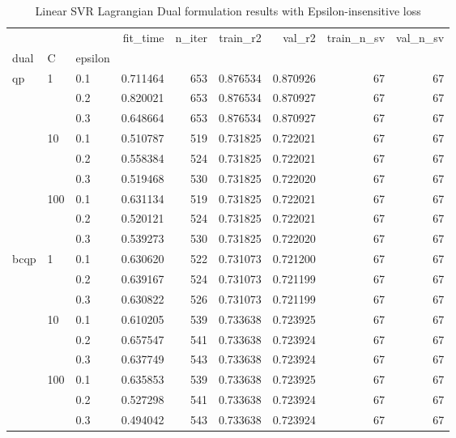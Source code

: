 \begin{table}[H]
\centering
\caption{Linear SVR Lagrangian Dual formulation results with Epsilon-insensitive loss}
\label{linear_lagrangian_dual_svr_cv_results}
\begin{tabular}{lllrrrrrr}
\toprule
     &     &     &  fit\_time &  n\_iter &  train\_r2 &    val\_r2 &  train\_n\_sv &  val\_n\_sv \\
dual & C & epsilon &           &         &           &           &             &           \\
\midrule
qp & 1   & 0.1 &  0.711464 &     653 &  0.876534 &  0.870926 &          67 &        67 \\
     &     & 0.2 &  0.820021 &     653 &  0.876534 &  0.870927 &          67 &        67 \\
     &     & 0.3 &  0.648664 &     653 &  0.876534 &  0.870927 &          67 &        67 \\
     & 10  & 0.1 &  0.510787 &     519 &  0.731825 &  0.722021 &          67 &        67 \\
     &     & 0.2 &  0.558384 &     524 &  0.731825 &  0.722021 &          67 &        67 \\
     &     & 0.3 &  0.519468 &     530 &  0.731825 &  0.722020 &          67 &        67 \\
     & 100 & 0.1 &  0.631134 &     519 &  0.731825 &  0.722021 &          67 &        67 \\
     &     & 0.2 &  0.520121 &     524 &  0.731825 &  0.722021 &          67 &        67 \\
     &     & 0.3 &  0.539273 &     530 &  0.731825 &  0.722020 &          67 &        67 \\
bcqp & 1   & 0.1 &  0.630620 &     522 &  0.731073 &  0.721200 &          67 &        67 \\
     &     & 0.2 &  0.639167 &     524 &  0.731073 &  0.721199 &          67 &        67 \\
     &     & 0.3 &  0.630822 &     526 &  0.731073 &  0.721199 &          67 &        67 \\
     & 10  & 0.1 &  0.610205 &     539 &  0.733638 &  0.723925 &          67 &        67 \\
     &     & 0.2 &  0.657547 &     541 &  0.733638 &  0.723924 &          67 &        67 \\
     &     & 0.3 &  0.637749 &     543 &  0.733638 &  0.723924 &          67 &        67 \\
     & 100 & 0.1 &  0.635853 &     539 &  0.733638 &  0.723925 &          67 &        67 \\
     &     & 0.2 &  0.527298 &     541 &  0.733638 &  0.723924 &          67 &        67 \\
     &     & 0.3 &  0.494042 &     543 &  0.733638 &  0.723924 &          67 &        67 \\
\bottomrule
\end{tabular}
\end{table}
